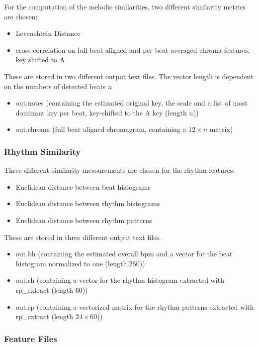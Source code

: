 For the computation of the melodic similarities, two different similarity metrics are chosen: 
\begin{itemize}
	\setlength\itemsep{-0.5em}
	\item Levenshtein Distance 
	\item cross-correlation on full beat aligned and per beat averaged chroma features, key shifted to A
\end{itemize}
These are stored in two different output text files. The vector length is dependent on the numbers of detected beats $n$
\begin{itemize}
	\setlength\itemsep{-0.5em}
	\item out.notes (containing the estimated original key, the scale and a list of most dominant key per beat, key-shifted to the A key (length $n$))
	\item out.chroma (full beat aligned chromagram, containing a $12 \times n$ matrix)
\end{itemize}


\subsubsection{Rhythm Similarity}

Three different similarity measurements are chosen for the rhythm features: 
\begin{itemize}
	\setlength\itemsep{-0.5em}
	\item Euclidean distance between beat histograms
	\item Euclidean distance between rhythm histograms
	\item Euclidean distance between rhythm patterns
\end{itemize}
These are stored in three different output text files.
\begin{itemize}
	\setlength\itemsep{-0.5em}
	\item out.bh (containing the estimated overall bpm and a vector for the beat histogram normalized to one (length $250$))
	\item out.rh (containing a vector for the rhythm histogram extracted with rp\_extract (length $60$))
	\item out.rp (containing a vectorized matrix for the rhythm patterns extracted with rp\_extract (length $24 \times 60$))
\end{itemize}

\subsubsection{Feature Files}

